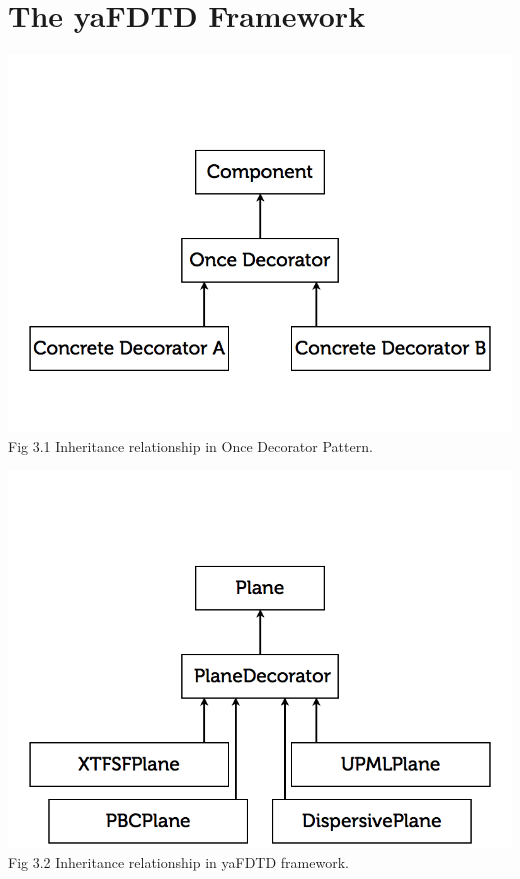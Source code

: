 \documentclass[openany]{book}
\begin{document}
\chapter{The yaFDTD Framework}








\clearpage
\begin{center}
\includegraphics[scale=0.5]{images/once-decorator.jpg}\\
Fig 3.1
Inheritance relationship in Once Decorator Pattern.
\end{center}
\begin{center}
\includegraphics[scale=0.5]{images/once-decorator-yafdtd.png}\\
Fig 3.2
Inheritance relationship in yaFDTD framework.
\end{center}
\end{document}
